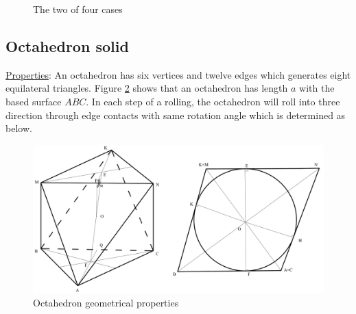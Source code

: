 \begin{center}
\begin{figure}[h]
\hfill
{}
\caption{The two of four cases}
\label{fig:TetraPathFiding}
\end{figure}
\end{center}
\clearpage
\newpage
\subsection{Octahedron solid}
\noindent\uline{Properties}: 
An octahedron has six vertices and twelve edges which generates eight equilateral triangles. Figure \ref{fig:octaGeo1} shows that an octahedron has length $a$ with the based surface $ABC$. In each step of a rolling, the octahedron will roll into three direction through edge contacts with same rotation angle which is determined as below.   

\begin{figure}[h]
\centering
	\includegraphics[width=\textwidth]{image/octaGeo11.png}
%	
	\caption{Octahedron geometrical properties}
	\label{fig:octaGeo1}
\end{figure}


